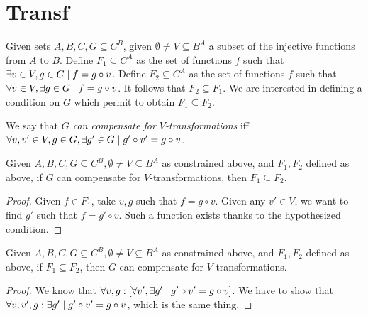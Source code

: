 \documentclass[version=3.21, pagesize, notitlepage, twoside=off, bibliography=totoc, DIV=calc, fontsize=12pt, a4paper]{scrartcl}
\begin{document}



\appendix
\section{Transf}
Given sets $A, B, C, G \subseteq C^B$, given $\emptyset ≠ V \subseteq B^A$ a subset of the injective functions from $A$ to $B$. Define $F_1 \subseteq C^A$ as the set of functions $f$ such that $\exists v \in V, g \in G \suchthat f = g \circ v$. Define $F_2 \subseteq C^A$ as the set of functions $f$ such that $\forall v \in V, \exists g \in G \suchthat f = g \circ v$. It follows that $F_2 \subseteq F_1$. We are interested in defining a condition on $G$ which permit to obtain $F_1 \subseteq F_2$. 

We say that \emph{$G$ can compensate for $V$-transformations} iff $\forall v, v' \in V, g \in G, \exists g' \in G \suchthat g' \circ v' = g \circ v$.%

\begin{lemma}
	Given $A, B, C, G \subseteq C^B, \emptyset ≠ V \subseteq B^A$ as constrained above, and $F_1, F_2$ defined as above, if $G$ can compensate for $V$-transformations, then $F_1 \subseteq F_2$.
\end{lemma}
\begin{proof}
	Given $f \in F_1$, take $v, g$ such that $f = g \circ v$. Given any $v' \in V$, we want to find $g'$ such that $f = g' \circ v$. Such a function exists thanks to the hypothesized condition.
\end{proof}

\begin{lemma}
	Given $A, B, C, G \subseteq C^B, \emptyset ≠ V \subseteq B^A$ as constrained above, and $F_1, F_2$ defined as above, if $F_1 \subseteq F_2$, then $G$ can compensate for $V$-transformations.
\end{lemma}
\begin{proof}
	We know that $\forall v, g: [\forall v', \exists g' \suchthat g' \circ v' = g \circ v]$. We have to show that $\forall v, v', g: \exists g' \suchthat g' \circ v' = g \circ v$, which is the same thing.
\end{proof}
\end{document}
